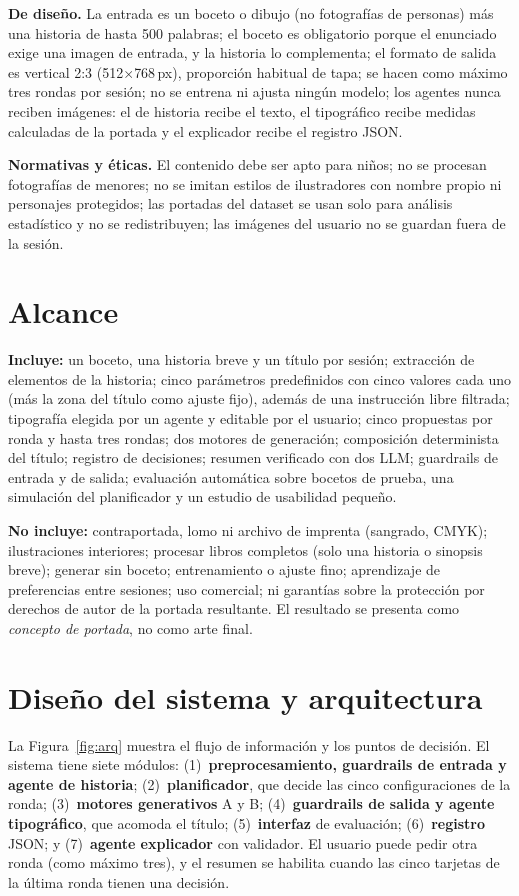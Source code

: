 \documentclass[10pt,a4paper,twocolumn]{article}
\begin{document}
\textbf{De diseño.} La entrada es un boceto o dibujo (no fotografías de personas) más una historia de hasta 500 palabras; el boceto es obligatorio porque el enunciado exige una imagen de entrada, y la historia lo complementa; el formato de salida es vertical 2:3 (512$\times$768\,px), proporción habitual de tapa; se hacen como máximo tres rondas por sesión; no se entrena ni ajusta ningún modelo; los agentes nunca reciben imágenes: el de historia recibe el texto, el tipográfico recibe medidas calculadas de la portada y el explicador recibe el registro JSON.

\textbf{Normativas y éticas.} El contenido debe ser apto para niños; no se procesan fotografías de menores; no se imitan estilos de ilustradores con nombre propio ni personajes protegidos; las portadas del dataset se usan solo para análisis estadístico y no se redistribuyen; las imágenes del usuario no se guardan fuera de la sesión.

\section{Alcance}
\textbf{Incluye:} un boceto, una historia breve y un título por sesión; extracción de elementos de la historia; cinco parámetros predefinidos con cinco valores cada uno (más la zona del título como ajuste fijo), además de una instrucción libre filtrada; tipografía elegida por un agente y editable por el usuario; cinco propuestas por ronda y hasta tres rondas; dos motores de generación; composición determinista del título; registro de decisiones; resumen verificado con dos LLM; guardrails de entrada y de salida; evaluación automática sobre bocetos de prueba, una simulación del planificador y un estudio de usabilidad pequeño.

\textbf{No incluye:} contraportada, lomo ni archivo de imprenta (sangrado, CMYK); ilustraciones interiores; procesar libros completos (solo una historia o sinopsis breve); generar sin boceto; entrenamiento o ajuste fino; aprendizaje de preferencias entre sesiones; uso comercial; ni garantías sobre la protección por derechos de autor de la portada resultante. El resultado se presenta como \emph{concepto de portada}, no como arte final.

\section{Diseño del sistema y arquitectura}\label{sec:arq}
La Figura~\ref{fig:arq} muestra el flujo de información y los puntos de decisión. El sistema tiene siete módulos:
(1)~\textbf{preprocesamiento, guardrails de entrada y agente de historia};
(2)~\textbf{planificador}, que decide las cinco configuraciones de la ronda;
(3)~\textbf{motores generativos} A y B;
(4)~\textbf{guardrails de salida y agente tipográfico}, que acomoda el título;
(5)~\textbf{interfaz} de evaluación;
(6)~\textbf{registro} JSON; y
(7)~\textbf{agente explicador} con validador.
El usuario puede pedir otra ronda (como máximo tres), y el resumen se habilita cuando las cinco tarjetas de la última ronda tienen una decisión.
\end{document}
